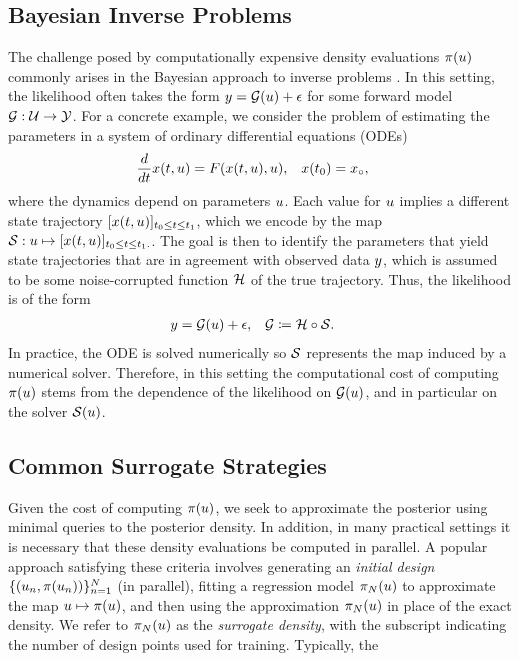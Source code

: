 \documentclass[12pt]{article}
\begin{document}
\subsection{Bayesian Inverse Problems}
The challenge posed by computationally expensive density evaluations $\postDens(\Par)$ commonly 
arises in the Bayesian approach to inverse problems \citep{Stuart_BIP}. In this setting, 
the likelihood often takes the form $\obs = \fwd(\Par) + \noise$ for some forward model
$\fwd: \parSpace \to \obsSpace$. For a concrete example, we consider the problem of estimating the 
parameters in a system of ordinary differential equations (ODEs)
\begin{align}
\frac{d}{d\Time} \state(\Time, \Par) &= \odeRHS(\state(\Time, \Par), \Par), &&x(\timeStart) = \stateIC, \label{ode_ivp}
\end{align}
where the dynamics depend on parameters $\Par$. Each value for $\Par$ implies a different state trajectory
$[\state(\Time, \Par)]_{\timeStart \leq \Time \leq \timeEnd}$, which we encode by the
map $\solutionOp: \Par \mapsto [\state(\Time, \Par)]_{\timeStart \leq \Time \leq \timeEnd.}$. The goal is then 
to identify the parameters that yield state trajectories that are in agreement with observed data 
$\obs$, which is assumed to be some noise-corrupted function $\obsOp$ of the true trajectory. Thus, the 
likelihood is of the form 
\begin{align}
&\obs = \fwd(\Par) + \noise, &&\fwd \Def \obsOp \circ \solutionOp.
\end{align}
In practice, the ODE is solved numerically so $\solutionOp$ represents the map induced by a numerical 
solver. Therefore, in this setting the computational cost of computing $\postDens(\Par)$ stems from the 
dependence of the likelihood on $\fwd(\Par)$, and in particular on the solver $\solutionOp(\Par)$.

\subsection{Common Surrogate Strategies} \label{sec:surrogate-examples}
Given the cost of computing $\postDens(\Par)$, we seek to approximate the posterior
using minimal queries to the posterior density. In addition, in many practical
settings it is necessary that these density evaluations be computed in parallel. 
A popular approach satisfying these criteria involves generating an 
\textit{initial design} $\{(\Par_{\idxDesign}, \postDens(\Par_{\idxDesign}))\}_{\idxDesign=1}^{\Ndesign}$ 
(in parallel), fitting a regression model $\postEm[\Ndesign](\Par)$ to approximate 
the map $\Par \mapsto \postDens(\Par)$, and then using the approximation $\postEm[\Ndesign](\Par)$
in place of the exact density. We refer to $\postEm[\Ndesign](\Par)$ as the 
\textit{surrogate density}, with the subscript indicating the number of design points
used for training. Typically, the 
\end{document}
